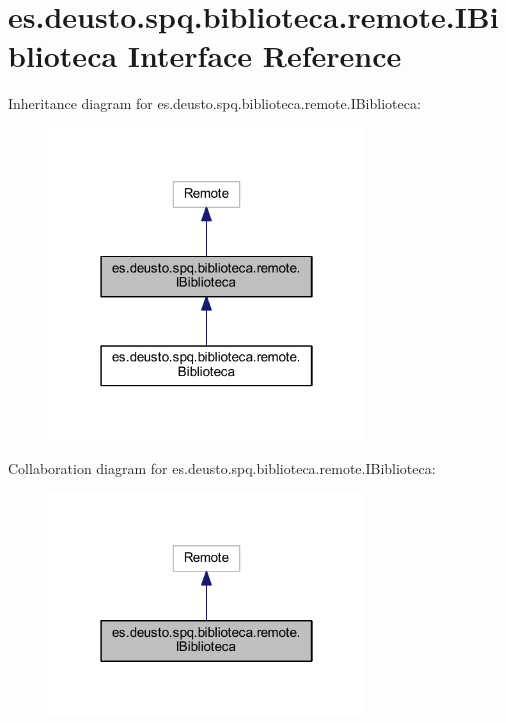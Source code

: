 \hypertarget{interfacees_1_1deusto_1_1spq_1_1biblioteca_1_1remote_1_1_i_biblioteca}{}\section{es.\+deusto.\+spq.\+biblioteca.\+remote.\+I\+Biblioteca Interface Reference}
\label{interfacees_1_1deusto_1_1spq_1_1biblioteca_1_1remote_1_1_i_biblioteca}


Inheritance diagram for es.\+deusto.\+spq.\+biblioteca.\+remote.\+I\+Biblioteca\+:
\nopagebreak
\begin{figure}[H]
\begin{center}
\leavevmode
\includegraphics[width=238pt]{interfacees_1_1deusto_1_1spq_1_1biblioteca_1_1remote_1_1_i_biblioteca__inherit__graph}
\end{center}
\end{figure}


Collaboration diagram for es.\+deusto.\+spq.\+biblioteca.\+remote.\+I\+Biblioteca\+:
\nopagebreak
\begin{figure}[H]
\begin{center}
\leavevmode
\includegraphics[width=238pt]{interfacees_1_1deusto_1_1spq_1_1biblioteca_1_1remote_1_1_i_biblioteca__coll__graph}
\end{center}
\end{figure}
